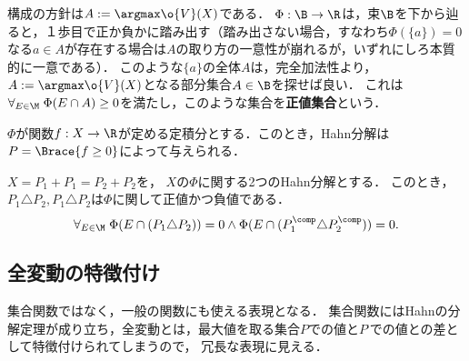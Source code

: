 \documentclass[uplatex, dvipdfmx]{jsreport}
\begin{document}
\begin{remarks}
    構成の方針は$A:=\argmax\o{V}(X)$である．
    $\Phi:\B\to\R$は，束$\B$を下から辿ると，１歩目で正か負かに踏み出す（踏み出さない場合，すなわち$\Phi(\{a\})=0$なる$a\in A$が存在する場合は$A$の取り方の一意性が崩れるが，いずれにしろ本質的に一意である）．
    このような$\{a\}$の全体$A$は，完全加法性より，$A:=\argmax\o{V}(X)$となる部分集合$A\in\B$を探せば良い．
    これは$\forall_{E\in\M}\;\Phi(E\cap A)\ge0$を満たし，このような集合を\textbf{正値集合}という．
\end{remarks}

\begin{example}
    $\Phi$が関数$f:X\to\R$が定める定積分とする．このとき，Hahn分解は$P=\Brace{f\ge0}$によって与えられる．
\end{example}

\begin{theorem}[Hahn分解の一意性]
    $X=P_1+P_1^\comp=P_2+P_2^\comp$を，
    $X$の$\Phi$に関する2つのHahn分解とする．
    このとき，$P_1\triangle P_2,P_1^\comp\triangle P_2^\comp$は$\Phi$に関して正値かつ負値である．
    \[\forall_{E\in\M}\;\Phi(E\cap(P_1\triangle P_2))=0\land\Phi(E\cap(P^\comp_1\triangle P^\comp_2))=0.\]
\end{theorem}

\subsection{全変動の特徴付け}

\begin{tcolorbox}[colframe=ForestGreen, colback=ForestGreen!10!white,breakable,colbacktitle=ForestGreen!40!white,coltitle=black,fonttitle=\bfseries\sffamily,
title=]
    集合関数ではなく，一般の関数にも使える表現となる．
    集合関数にはHahnの分解定理が成り立ち，全変動とは，最大値を取る集合$P$での値と$P^\comp$での値との差として特徴付けられてしまうので，
    冗長な表現に見える．
\end{tcolorbox}
\end{document}
